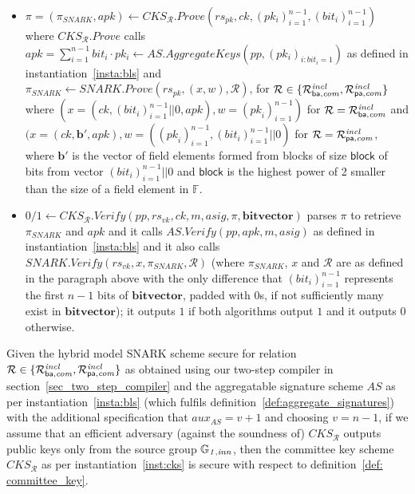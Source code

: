 \begin{construction}
\begin{itemize}
\item $\pi = (\pi_{SNARK}, \mathit{apk}) \leftarrow \mathit{CKS_{\mathcal{R}}.Prove}
(\mathit{rs}_{\mathit{pk}}, \mathit{ck}, (\mathit{pk_i})_{i=1}^{n-1}, (\mathit{bit_i})_{i=1}^{n-1})$ 
where $\mathit{CKS_{\mathcal{R}}.Prove}$ calls \\ 
$\mathit{apk} = \sum_{i=1}^{n-1} \mathit{bit_i} \cdot \mathit{pk_i} \leftarrow \mathit{AS.AggregateKeys}(\mathit{pp}, (\mathit{pk_i})_{i:\mathit{bit_i = 1}})$ 
as defined in instantiation~\ref{insta:bls} and \\
$\pi_{SNARK} \leftarrow \mathit{SNARK.Prove}(\mathit{rs_{pk}}, (x,w), \mathcal{R})$, for $\mathcal{R} \in \{\mathcal{R}^{\mathit{incl}}_{\mathsf{ba},\mathit{com}}, \mathcal{R}^{\mathit{incl}}_{\mathsf{pa},\mathit{com}} \}$ \\ where
$(x = (\mathit{ck}, (\mathit{bit_i})_{i=1}^{n-1}||0, \mathit{apk}), w = (\mathit{pk}_i)_{i=1}^{n-1})$ for $\mathcal{R} = \mathcal{R}^{\mathit{incl}}_{\mathsf{ba},\mathit{com}}$ and \\
$(x = (\mathit{ck}, \mathbf{b'}, \mathit{apk}), w = ((\mathit{pk}_i)_{i=1}^{n-1}, (\mathit{bit_i})_{i=1}^{n-1}||0)$ for $\mathcal{R} = \mathcal{R}^{\mathit{incl}}_{\mathsf{pa},\mathit{com}}$, 
where $\mathbf{b'}$ is the vector of field elements formed from blocks of size $\mathsf{block}$ of bits from vector $(\mathit{bit_i})_{i=1}^{n-1}||0$ 
and $\mathsf{block}$ is the highest power of 2 smaller than the size of a field element in $\mathbb{F}$. 

\item $0/1 \leftarrow \mathit{CKS_{\mathcal{R}}.Verify}(\mathit{pp}, \mathit{rs}_{\mathit{vk}}, \mathit{ck}, m, \mathit{asig}, \pi, \mathbf{bitvector})$ 
parses $\pi$ to retrieve $\pi_{\mathit{SNARK}}$ and $\mathit{apk}$ and it calls $\mathit{AS.Verify(\mathit{pp}, \mathit{apk}, m, \mathit{asig})}$ 
as defined in instantiation~\ref{insta:bls} and it also calls \\
$\mathit{SNARK.Verify}(\mathit{rs_{vk}}, x, \pi_{\mathit{SNARK}}, \mathcal{R})$ (where $\pi_{\mathit{SNARK}}$, $x$ and $\mathcal{R}$ are as defined in the 
paragraph above with the only difference that $(\mathit{bit_i})_{i=1}^{n-1}$ represents the first $n-1$ bits of $\mathbf{bitvector}$, padded with $0$s, if not sufficiently 
many exist in $\mathbf{bitvector}$); it outputs $1$ if both algorithms output $1$ and it outputs $0$ otherwise.
\end{itemize}
\end{construction}

\begin{theorem}Given the hybrid model SNARK scheme secure for relation $\mathcal{R} \in \{ \mathcal{R}^{\mathit{incl}}_{\mathsf{ba},\mathit{com}}, \mathcal{R}^{\mathit{incl}}_{\mathsf{pa},\mathit{com}}\}$ as 
obtained using our two-step compiler in section~\ref{sec_two_step_compiler} and the aggregatable signature scheme $\mathit{AS}$ 
                     as per instantiation~\ref{insta:bls} (which fulfils definition~\ref{def:aggregate_signatures}) with the additional 
                     specification that $\mathit{aux}_{\mathit{AS}} = v+1$ and choosing $v = n-1$, 
if we assume that an efficient adversary (against the soundness of) $\mathit{CKS}_{\mathcal{R}}$ outputs public keys only from the source group $\mathbb{G}_{\mathit{1,inn}}$,  
then the committee key scheme $\mathit{CKS}_{\mathcal{R}}$ as per instantiation~\ref{inst:cks} is secure with respect to definition~\ref{def: committee_key}.
\end{theorem}

